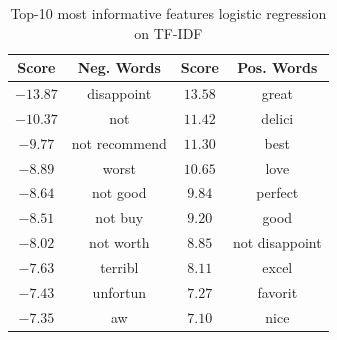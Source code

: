 \documentclass[11pt]{article}
\begin{document}
\begin{minipage}[b]{0.48\textwidth}
    \begin{table}[H]
        \begin{center}
            \begin{tabular}{||c||c|c|c||}
                \hline
                Score & Neg. Words & Score & Pos. Words\\
                \hline
                \hline
                $-13.87$ & disappoint & $13.58$ & great   \\ \hline       
            	$-10.37$ & not & $11.42$ & delici     \\ \hline    
            	$-9.77$ & not recommend & $11.30$ & best        \\ \hline   
            	$-8.89$ & worst & $10.65$ & love        \\ \hline   
            	$-8.64$ & not good & $9.84$ & perfect     \\ \hline   
            	$-8.51$ & not buy & $9.20$ & good         \\ \hline  
            	$-8.02$ & not worth & $8.85$ & not disappoint \\ \hline
            	$-7.63$ & terribl & $8.11$ & excel      \\ \hline    
            	$-7.43$ & unfortun & $7.27$ & favorit   \\ \hline     
            	$-7.35$ & aw & $7.10$ & nice \\ \hline
                \hline
                \hline
            \end{tabular}
        \caption{Top-10 most informative features logistic regression on TF-IDF}
        \label{ngrams_t}
        \end{center}
    \end{table}
\end{minipage}
\end{document}
